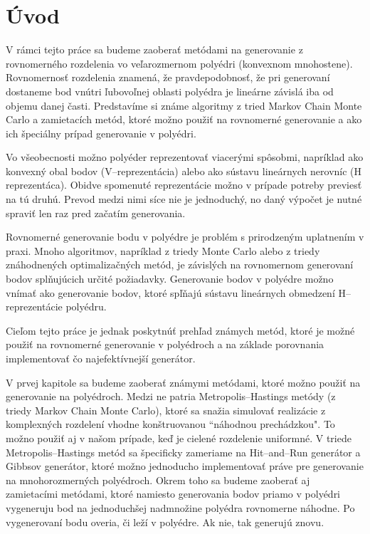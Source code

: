 \chapter*{Úvod} %

V rámci tejto práce sa budeme zaoberať metódami na generovanie z rovnomerného rozdelenia vo veľarozmernom polyédri (konvexnom mnohostene). Rovnomernosť rozdelenia znamená, že pravdepodobnosť, že pri generovaní dostaneme bod vnútri ľubovoľnej oblasti polyédra je lineárne závislá iba od objemu danej časti. Predstavíme si známe algoritmy z tried Markov Chain Monte Carlo a zamietacích metód, ktoré možno použiť na rovnomerné generovanie a ako ich špeciálny prípad generovanie v polyédri. 

Vo všeobecnosti možno polyéder reprezentovať viacerými spôsobmi, napríklad ako konvexný obal bodov (V--reprezentácia) alebo ako sústavu lineárnych nerovníc (H reprezentáca). Obidve spomenuté reprezentácie možno v prípade potreby previesť na tú druhú. Prevod medzi nimi síce nie je jednoduchý, no daný výpočet je nutné spraviť len raz pred začatím generovania. 

Rovnomerné generovanie bodu v polyédre je problém s prirodzeným uplatnením v praxi. Mnoho algoritmov, napríklad z triedy Monte Carlo alebo z triedy znáhodnených optimalizačných metód, je závislých na rovnomernom generovaní bodov splňujúcich určité požiadavky.
Generovanie bodov v polyédre možno vnímať ako generovanie bodov, ktoré spľňajú sústavu lineárnych obmedzení H--reprezentácie polyédru.

Cieľom tejto práce je jednak poskytnúť prehľad známych metód, ktoré je možné použiť na rovnomerné generovanie v polyédroch a na základe porovnania implementovať čo najefektívnejší generátor.

V prvej kapitole sa budeme zaoberať známymi metódami, ktoré možno použiť na generovanie na polyédroch. Medzi ne patria Metropolis--Hastings metódy (z triedy Markov Chain Monte Carlo), ktoré sa snažia simulovať realizácie z komplexných rozdelení vhodne konštruovanou ``náhodnou prechádzkou". To možno použiť aj v našom prípade, keď je cielené rozdelenie uniformné. V triede Metropolis--Hastings metód sa špecificky zameriame na Hit--and--Run generátor a Gibbsov generátor, ktoré možno jednoducho implementovať práve pre generovanie na mnohorozmerných polyédroch.
Okrem toho sa budeme zaoberať aj zamietacími metódami, ktoré namiesto generovania bodov priamo v polyédri vygeneruju bod na jednoduchšej nadmnožine polyédra rovnomerne náhodne. Po vygenerovaní bodu overia, či leží v polyédre. Ak nie, tak generujú znovu.

